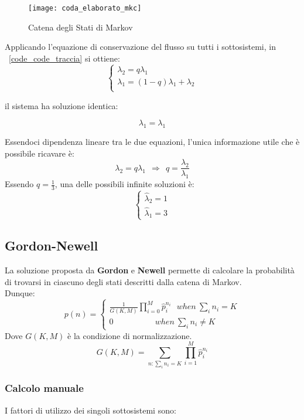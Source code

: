 \begin{figure}[!htbp]
  \centering
  \texttt{[image: coda\_elaborato\_mkc]}
  \caption{Catena degli Stati di Markov}
  \label{code_}
\end{figure}

Applicando l'equazione di conservazione del flusso su tutti i sottosistemi, in
\figurename~\ref{code_code_traccia} si ottiene:
$$
\begin{cases}\lambda_2 = q\lambda_1 \\
\lambda_1 = (1-q)\lambda_1 + \lambda_2 \\
\end{cases}
$$


il sistema ha soluzione identica:

$$ \lambda_1 = \lambda_1 $$

Essendoci dipendenza lineare tra le due equazioni, l'unica informazione utile che
è possibile ricavare è:
$$ \lambda_2 = q \lambda_1 \ \ \Longrightarrow \ \ q=\frac{\lambda_2}{\lambda_1}$$
Essendo $q = \frac{1}{3} $, una delle possibili infinite soluzioni è:
$$
\begin{cases}
\widehat{\lambda}_2 = 1 \\
\widehat{\lambda}_1 = 3
\end{cases}
$$

\clearpage

\subsection{Gordon-Newell}
La soluzione proposta da \textbf{Gordon} e \textbf{Newell} permette di calcolare
la probabilità di trovarsi in ciascuno degli stati descritti dalla catena di Markov.\\
Dunque:
$$ p(n)=
\begin{cases}
  \frac{1}{G(K,M)}\prod_{i=0}^M \widehat{p}_i^{n_i} \ \ \ when \ \sum_{i}n_i = K\\
  0 \ \ \ \ \ \ \ \ \ \ \ \ \ \ \ \ \ \ \ \ \ \ \ when \ \sum_{i}n_i \neq K
\end{cases}
$$
Dove $G(K,M)$ è la condizione di normalizzazione.
$$ G(K,M)=\sum_{n : \sum_{i}n_i=K} \prod_{i=1}^M \widehat{p}_i^{n_i}$$


\subsubsection{Calcolo manuale}

I fattori di utilizzo dei singoli sottosistemi sono:

